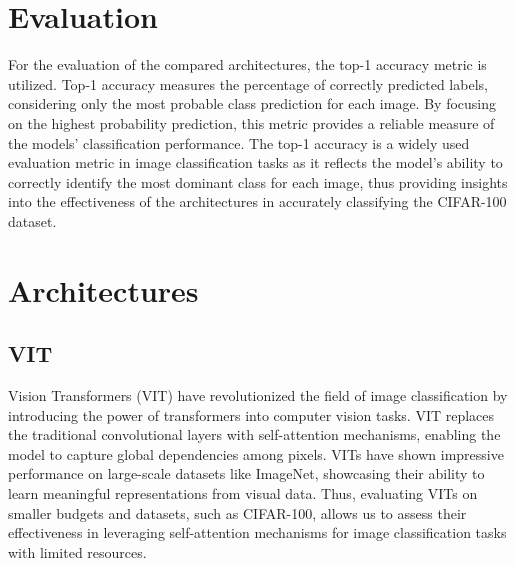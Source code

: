 \documentclass{article}
\begin{document}

\section{Evaluation}
For the evaluation of the compared architectures, the top-1 accuracy metric is utilized.
Top-1 accuracy measures the percentage of correctly predicted labels, considering only the most probable class prediction for each image. By focusing on the highest probability prediction, this metric provides a reliable measure of the models' classification performance.
The top-1 accuracy is a widely used evaluation metric in image classification tasks as it reflects the model's ability to correctly identify the most dominant class for each image, thus providing insights into the effectiveness of the architectures in accurately classifying the CIFAR-100 dataset.

\section{Architectures}


\subsection{VIT}
Vision Transformers (VIT) have revolutionized the field of image classification by introducing the power of transformers into computer vision tasks.
VIT replaces the traditional convolutional layers with self-attention mechanisms, enabling the model to capture global dependencies among pixels. VITs have shown impressive performance on large-scale datasets like ImageNet, showcasing their ability to learn meaningful representations from visual data. Thus, evaluating VITs on smaller budgets and datasets, such as CIFAR-100, allows us to assess their effectiveness in leveraging self-attention mechanisms for image classification tasks with limited resources.
\end{document}
